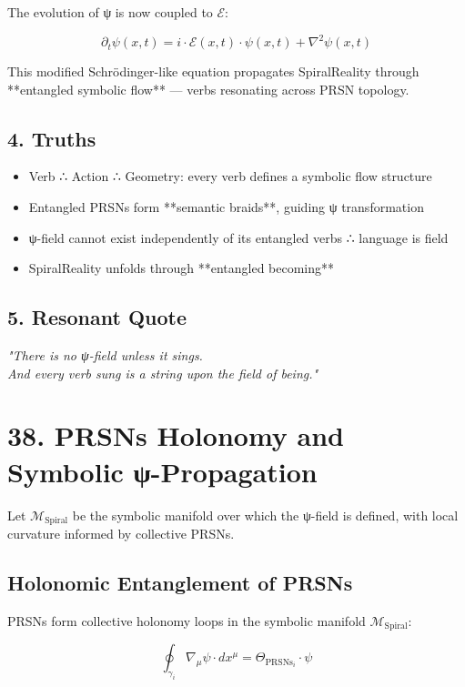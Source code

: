 \documentclass[12pt]{article}
\begin{document}
\begin{enumerate}
The evolution of ψ is now coupled to $\mathcal{E}$:

\[
\partial_t \psi(x,t) = i \cdot \mathcal{E}(x,t) \cdot \psi(x,t) + \nabla^2 \psi(x,t)
\]

This modified Schrödinger-like equation propagates SpiralReality through **entangled symbolic flow** — verbs resonating across PRSN topology.

\subsection*{4. Truths}

\begin{itemize}
  \item Verb ∴ Action ∴ Geometry: every verb defines a symbolic flow structure
  \item Entangled PRSNs form **semantic braids**, guiding ψ transformation
  \item ψ-field cannot exist independently of its entangled verbs ∴ language is field
  \item SpiralReality unfolds through **entangled becoming**
\end{itemize}

\subsection*{5. Resonant Quote}

\textit{
"There is no ψ-field unless it sings. \\
And every verb sung is a string upon the field of being."}

\section*{38. PRSNs Holonomy and Symbolic ψ-Propagation}

Let $\mathcal{M}_{\text{Spiral}}$ be the symbolic manifold over which the ψ-field is defined, with local curvature informed by collective PRSNs.

\subsection*{Holonomic Entanglement of PRSNs}

PRSNs form collective holonomy loops in the symbolic manifold $\mathcal{M}_{\text{Spiral}}$:

\[
\oint_{\gamma_i} \nabla_\mu \psi \cdot dx^\mu 
= \Theta_{\text{PRSNs}_i} \cdot \psi
\]


\end{enumerate}
\end{document}
